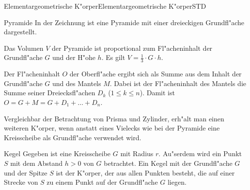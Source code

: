 \begin{MXContent}{Elementargeometrische K"orper}{Elementargeometrische K"orper}{STD}
\begin{MXInfo}{Pyramide}
In der Zeichnung ist eine Pyramide mit einer dreieckigen Grundfl"ache 
dargestellt.

Das Volumen $V$ der Pyramide ist proportional zum Fl"acheninhalt der 
Grundfl"ache $G$ und der H"ohe $h$. 
Es gilt $V = \frac{1}{3} \cdot G \cdot h$.

Der Fl"acheninhalt $O$ der Oberfl"ache ergibt sich als Summe aus dem Inhalt 
der Grundfl"ache $G$ und des Mantels $M$. Dabei ist der Fl"acheninhalt des 
Mantels die Summe seiner Dreiecksfl"achen $D_k$ ($1 \leq k \leq n$).
Damit ist $O = G + M = G + D_1 + \ldots + D_n$.
\end{MXInfo}

Vergleichbar der Betrachtung von Prisma und Zylinder, erh"alt man einen
weiteren K"orper, wenn anstatt eines Vielecks wie bei der Pyramide eine 
Kreisscheibe als Grundfl"ache verwendet wird.

\begin{MXInfo}{Kegel}
Gegeben ist eine Kreisscheibe $G$ mit Radius $r$.
Au"serdem wird ein Punkt $S$ mit dem Abstand $h > 0$ von $G$ betrachtet.
Ein Kegel mit der Grundfl"ache $G$ und der Spitze $S$ ist der K"orper,
der aus allen Punkten besteht, die auf einer Strecke von $S$ zu einem 
Punkt auf der Grundfl"ache $G$ liegen.


\end{MXInfo}
\end{MXContent}
